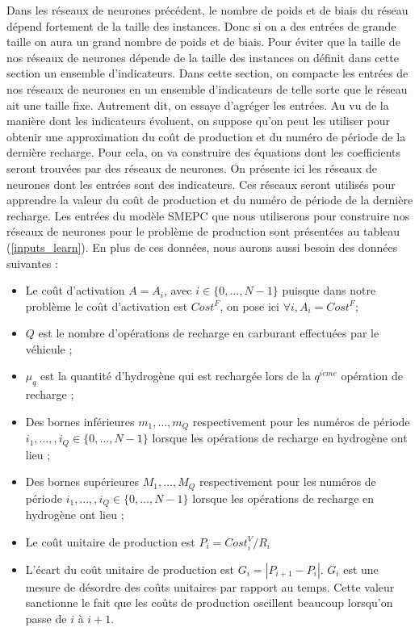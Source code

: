 Dans les réseaux de neurones précédent, le nombre de poids et de biais du réseau dépend fortement de la taille des instances. Donc si on a des entrées de grande taille on aura un grand nombre de poids et de biais. Pour éviter que la taille de nos réseaux de neurones dépende de la taille des instances on définit dans cette section un ensemble d'indicateurs. Dans cette section, on compacte les entrées de nos réseaux de neurones en un ensemble d'indicateurs de telle sorte que le réseau ait une taille fixe. Autrement dit, on essaye d'agréger les entrées. Au vu de la manière dont les indicateurs évoluent, on suppose qu'on peut les utiliser pour obtenir une approximation du coût de production et du numéro de période de la dernière recharge. Pour cela, on va construire des équations dont les coefficients seront trouvées par des réseaux de neurones.
On présente ici les réseaux de neurones dont les entrées sont des indicateurs. Ces réseaux seront utilisés pour apprendre la valeur du coût de production et du numéro de période de la dernière recharge. Les entrées du modèle SMEPC que nous utiliserons pour construire nos réseaux de neurones pour le problème de production sont présentées au tableau (\ref{inputs_learn}). En plus de ces données, nous aurons aussi besoin des données suivantes :


\begin{itemize}[label=$\square$]
	\item Le coût d'activation $A=A_i$, avec $i \in \{0, \dots, N-1\}$ puisque dans notre problème le coût d'activation est $Cost^F$, on pose ici $\forall i, A_i=Cost^F$;
	\item $Q$ est le nombre d'opérations de recharge en carburant effectuées par le véhicule ;
	\item $\mu_q$ est la quantité d'hydrogène qui est rechargée lors de la $q^{i\grave eme}$ opération de recharge ;
	\item Des bornes inférieures $m_1, \dots,m_Q$ respectivement pour les numéros de période $i_1, \dots,, i_Q\in \{0, \dots, N-1\}$ lorsque les opérations de recharge en hydrogène ont lieu ; 
	
	\item Des bornes supérieures $M_1, \dots,M_Q$ respectivement pour les numéros de période $i_1, \dots,, i_Q \in \{0, \dots, N-1\}$ lorsque les opérations de recharge en hydrogène ont lieu ; 
	\item Le coût unitaire de production est $P_i=Cost_i^V/R_i$
    \item L'écart du coût unitaire de production est $G_i=|P_{i+1}-P_i|$. $G_i$ est une mesure de désordre des coûts unitaires par rapport au temps. Cette valeur sanctionne le fait que les coûts de production oscillent beaucoup lorsqu'on passe de $i$ à $i+1$.
\end{itemize}
